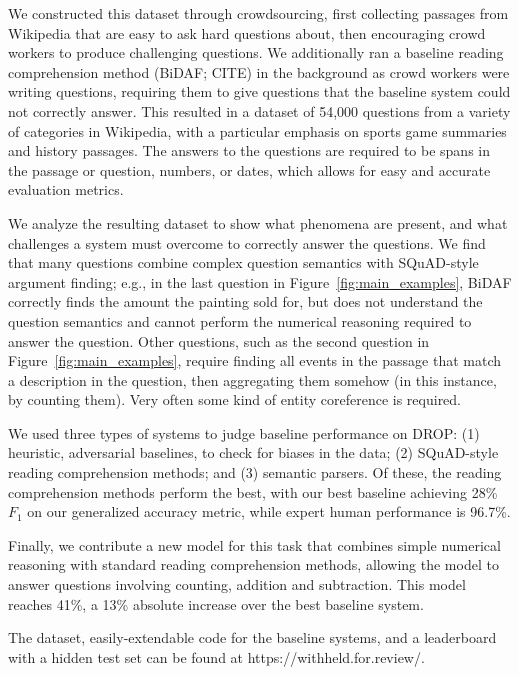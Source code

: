 \documentclass[11pt,a4paper]{article}
\newcommand{\figref}[1]{Figure~\ref{fig:#1}}
\begin{document}
We constructed this dataset through crowdsourcing, first collecting passages from Wikipedia that are easy to ask hard questions about, then encouraging crowd workers to produce challenging questions.  We additionally ran a baseline reading comprehension method (BiDAF; CITE) in the background as crowd workers were writing questions, requiring them to give questions that the baseline system could not correctly answer.  This resulted in a dataset of 54,000 questions from a variety of categories in Wikipedia, with a particular emphasis on sports game summaries and history passages.  The answers to the questions are required to be spans in the passage or question, numbers, or dates, which allows for easy and accurate evaluation metrics.

We analyze the resulting dataset to show what phenomena are present, and what challenges a system must overcome to correctly answer the questions.  We find that many questions combine complex question semantics with SQuAD-style argument finding; e.g., in the last question in \figref{main_examples}, BiDAF correctly finds the amount the painting sold for, but does not understand the question semantics and cannot perform the numerical reasoning required to answer the question.  Other questions, such as the second question in \figref{main_examples}, require finding all events in the passage that match a description in the question, then aggregating them somehow (in this instance, by counting them).  Very often some kind of entity coreference is required.

We used three types of systems to judge baseline performance on DROP: (1) heuristic, adversarial baselines, to check for biases in the data; (2) SQuAD-style reading comprehension methods; and (3) semantic parsers.  Of these, the reading comprehension methods perform the best, with our best baseline achieving 28\% $F_1$ on our generalized accuracy metric, while expert human performance is 96.7\%.

Finally, we contribute a new model for this task that combines simple numerical reasoning with standard reading comprehension methods, allowing the model to answer questions involving counting, addition and subtraction.  This model reaches 41\%, a 13\% absolute increase over the best baseline system.

The dataset, easily-extendable code for the baseline systems, and a leaderboard with a hidden test set can be found at https://withheld.for.review/.
\end{document}

